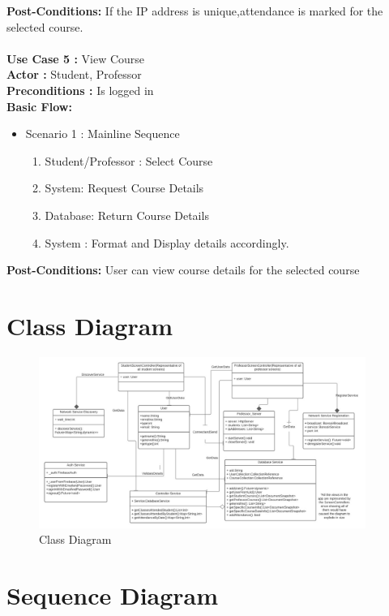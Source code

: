 \documentclass{article}
\begin{document}
\textbf{Post-Conditions:} If the IP address is unique,attendance is marked for the selected course.\\ \\
\textbf{Use Case 5 : }View Course\\
\textbf{Actor : }Student, Professor\\
\textbf{Preconditions : }Is logged in\\
\textbf{Basic Flow: } 
\begin{itemize}
    \item Scenario 1 : Mainline Sequence
        \begin{enumerate}
            \item Student/Professor : Select Course
            \item System: Request Course Details
            \item  Database:  Return Course Details
\item System : Format and Display details accordingly.        
\end{enumerate}
\end{itemize}
\textbf{Post-Conditions: }User can view course details for the selected course\\



\section{Class Diagram}
\begin{figure}[H]
    \centering
    \includegraphics[width=0.95\textwidth]{ClassDiagram.jpeg}
    \caption{Class Diagram}
    \label{fig:ClassDiagram}
\end{figure}

\section{Sequence Diagram} 
\end{document}
